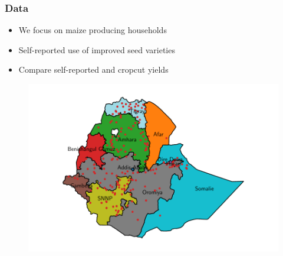 \documentclass{beamer}
\begin{document}
\begin{frame}
\frametitle{Data}

\begin{itemize}
    \item We focus on maize producing households 
    \item Self-reported use of improved seed varieties
    \item Compare self-reported and cropcut yields
\end{itemize}

\begin{figure}
    \centering
    \includegraphics[scale=.4]{results/figures/map_hhids.pdf}
\end{figure}

\end{frame}
\end{document}
